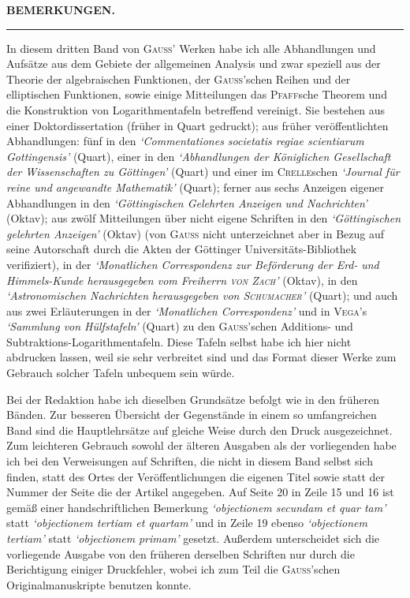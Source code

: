 \begingroup
\renewcommand{\arraystretch}{1.45}
\fancyhead[C]{}
\clearpage{}
\begin{center}\Large\textbf{BEMERKUNGEN.}\end{center}
\begin{center}\rule{.09\textwidth}{.4pt}\end{center}

In diesem dritten Band von \textsc{Gauss}’ Werken habe ich alle Abhandlungen und Aufsätze aus dem
Gebiete der allgemeinen Analysis und zwar speziell aus der Theorie der algebraischen Funktionen, der
\textsc{Gauss}’schen Reihen und der elliptischen Funktionen, sowie einige Mitteilungen das \textsc{Pfaff}sche Theorem
und die Konstruktion von Logarithmentafeln betreffend vereinigt. Sie bestehen aus einer Doktordissertation
(früher in Quart gedruckt); aus früher veröffentlichten Abhandlungen: fünf in den \textit{‘Commentationes societatis regiae scientiarum Gottingensis’} (Quart), einer in den \textit{‘Abhandlungen der Königlichen Gesellschaft der}
\textit{Wissenschaften zu Göttingen’} (Quart) und einer im \textsc{Crelle}schen \textit{‘Journal für reine und angewandte Mathematik’} (Quart); ferner aus sechs Anzeigen eigener Abhandlungen in den \textit{‘Göttingischen Gelehrten Anzeigen}
\textit{und Nachrichten’} (Oktav); aus zwölf Mitteilungen über nicht eigene Schriften in den \textit{‘Göttingischen gelehrten Anzeigen’} (Oktav) (von \textsc{Gauss} nicht unterzeichnet aber in Bezug auf seine Autorschaft durch die Akten
der Göttinger Universitäts-Bibliothek verifiziert), in der \textit{‘Monatlichen Correspondenz zur Beförderung der Erd-}
\textit{und Himmels-Kunde herausgegeben vom Freiherrn \textsc{von Zach}’} (Oktav), in den \textit{‘Astronomischen Nachrichten}
\textit{herausgegeben von \textsc{Schumacher}’} (Quart); und auch aus zwei Erläuterungen in der \textit{‘Monatlichen Correspondenz’}
und in \textsc{Vega}’s \textit{‘Sammlung von Hülfstafeln’} (Quart) zu den \textsc{Gauss}’schen Additions- und Subtraktions-Logarithmentafeln. Diese Tafeln selbst habe ich hier nicht abdrucken lassen, weil sie sehr verbreitet sind und
das Format dieser Werke zum Gebrauch solcher Tafeln unbequem sein würde.

Bei der Redaktion habe ich dieselben Grundsätze befolgt wie in den früheren Bänden. Zur besseren
Übersicht der Gegenstände in einem so umfangreichen Band sind die Hauptlehrsätze auf gleiche Weise
durch den Druck ausgezeichnet. Zum leichteren Gebrauch sowohl der älteren Ausgaben als der vorliegenden
habe ich bei den Verweisungen auf Schriften, die nicht in diesem Band selbst sich finden, statt des Ortes der
Veröffentlichungen die eigenen Titel sowie statt der Nummer der Seite die der Artikel angegeben. Auf
Seite 20 in Zeile 15 und 16 ist gemäß einer handschriftlichen Bemerkung \textit{‘objectionem secundam et quar%
tam’} statt \textit{‘objectionem tertiam et quartam’} und in Zeile 19 ebenso \textit{‘objectionem tertiam’} statt \textit{‘objectionem}
\textit{primam’} gesetzt. Außerdem unterscheidet sich die vorliegende Ausgabe von den früheren derselben Schriften nur durch die Berichtigung einiger Druckfehler, wobei ich zum Teil die \textsc{Gauss}’schen Originalmanuskripte benutzen konnte.

